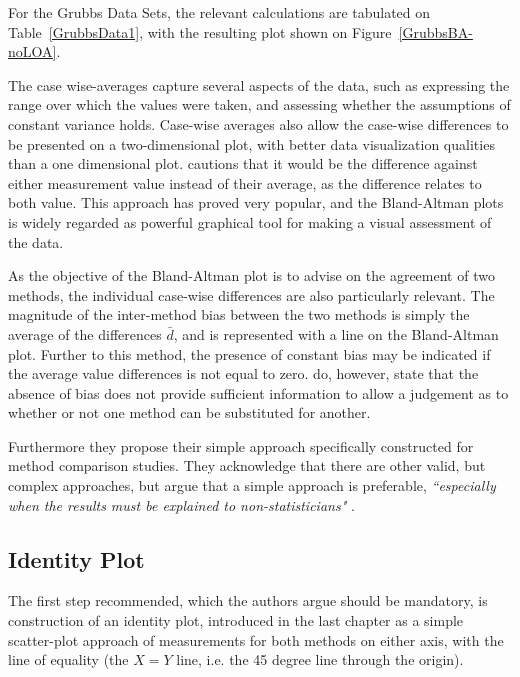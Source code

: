 \documentclass[12pt, a4paper]{report}
\theoremstyle{plain}
\theoremstyle{definition}
\theoremstyle{remark}
\begin{document}
For the Grubbs Data Sets, the relevant calculations are tabulated on Table~\ref{GrubbsData1}, with the resulting plot shown on Figure~\ref{GrubbsBA-noLOA}.

	
The case wise-averages capture several aspects of the data, such as expressing the range over which the values were taken, and assessing whether the assumptions of constant variance holds. Case-wise averages also allow the case-wise differences to be presented on a two-dimensional plot, with better data visualization qualities than a one dimensional plot. \citet{BA86}
	cautions that it would be the difference against either measurement value instead of their average, as the difference relates to both value. This approach has proved very popular, and the Bland-Altman plots is widely regarded as powerful graphical tool for making a visual assessment of the data.
	
As the objective of the Bland-Altman plot is to advise on the agreement of two methods, the individual case-wise differences are also particularly relevant. The magnitude of the inter-method bias between the two methods is simply the average of the differences $\bar{d}$, and is represented with a line on the Bland-Altman plot. Further to this method, the presence of constant bias may be indicated if the average value differences is not equal to zero. \citet{BA86} do, however, state that the absence of bias does not provide sufficient information to allow a judgement as to whether or not one method can be substituted for	another.
	
Furthermore they propose their simple approach specifically constructed for method comparison studies. They acknowledge that there are other valid, but complex approaches, but argue that
		a simple approach is preferable,
		\textit{``especially when the results must be explained to
			non-statisticians"} \citep*{BA83}.
		
		\subsection{Identity Plot}
The first step recommended, which the authors argue should be mandatory, is construction of an identity plot, introduced in the last chapter as a simple scatter-plot approach of measurements for both methods on either axis, with the line of equality (the $X=Y$ line, i.e. the 45 degree line through the origin). 
			
\end{document}
